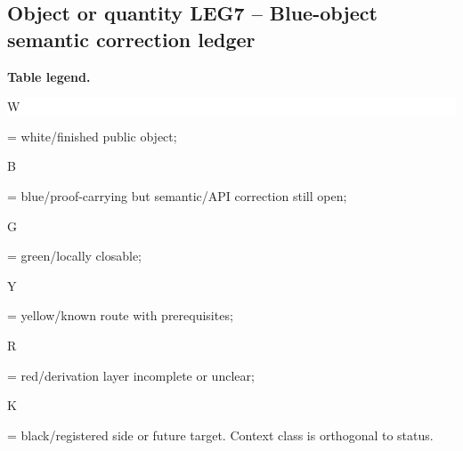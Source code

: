 \subsection*{Object or quantity LEG7 -- Blue-object semantic correction ledger}
\hypertarget{objproof:LEG7}{}
\par\smallskip\noindent\begin{minipage}{0.99\linewidth}\footnotesize\raggedright\textbf{Table legend.} \colorbox{white}{\strut W} = white/finished public object; \colorbox{cyan!20}{\strut B} = blue/proof-carrying but semantic/API correction still open; \colorbox{green!18}{\strut G} = green/locally closable; \colorbox{yellow!25}{\strut Y} = yellow/known route with prerequisites; \colorbox{red!20}{\strut R} = red/derivation layer incomplete or unclear; \colorbox{black!18}{\strut K} = black/registered side or future target. Context class is orthogonal to status.\end{minipage}\par\vspace{0.25em}
